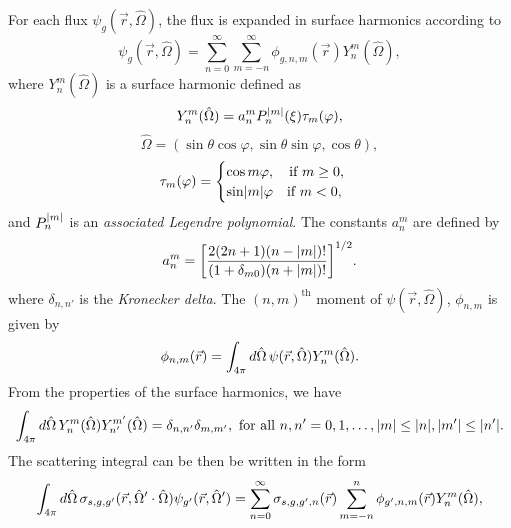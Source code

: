 For each flux $\psi_{g}(\vec{r},\hat{\Omega})$, the flux is expanded in surface harmonics according to
\begin{equation}
	\psi_{g}(\vec{r},\hat{\Omega}) = \sum_{n=0}^{\infty} \sum_{m=-n}^{\infty} \phi_{g,n,m}(\vec{r}) Y_{n}^{m}(\hat{\Omega}),
\end{equation}
where $Y_{n}^{m}(\hat{\Omega})$ is a surface harmonic defined as
\begin{equation}
	Y_{n}^{m}(\hat{\Omega}) = a_{n}^{m} P_{n}^{\lvert m\rvert}(\xi) \tau_{m}(\varphi),
\end{equation}
\begin{equation}
\hat{\Omega} = (\sin \theta \cos \varphi, \sin \theta \sin \varphi, \cos \theta),
\end{equation}
\begin{equation}
	\tau_{m}(\varphi) = \begin{cases}
					\cos m\varphi, \quad \text{if } m \geq 0, \\
					\sin \lvert m\rvert \varphi \quad \text{if } m < 0,
				      \end{cases}
\end{equation}
and $P_{n}^{\lvert m\rvert}$ is an \textit{associated Legendre polynomial}. The constants $a_{n}^{m}$ are defined by
\begin{equation}
	a_{n}^{m} = \bigg [ \frac{2(2n+1)(n-\lvert m\rvert)!}{(1+\delta_{m0})(n + \lvert m\rvert)!} \bigg ]^{1/2}.
\end{equation}
where $\delta_{n,n'}$ is the \textit{Kronecker delta}. The $(n,m)^{\text{th}}$ moment of $\psi(\vec{r}, \hat{\Omega})$, $\phi_{n,m}$ is given by
\begin{equation}
	\phi_{n,m}(\vec{r}) = \int_{4\pi} \mathop{}\!d \hat{\Omega} \, \psi(\vec{r},\hat{\Omega}) Y_{n}^{m}(\hat{\Omega}).
\end{equation}
From the properties of the surface harmonics, we have
\begin{equation}
	\int_{4\pi} \mathop{}\!d \hat{\Omega} \, Y_{n}^{m}(\hat{\Omega}) Y_{n'}^{m'}(\hat{\Omega}) = \delta_{n,n'} \delta_{m,m'}, \text{ for all } n, n' = 0, 1, \dots, \lvert m\rvert \leq \lvert n\rvert, \lvert m'\rvert \leq \lvert n'\rvert.
\end{equation}
The scattering integral can be then be written in the form
\begin{equation}
	\int_{4\pi} \mathop{}\!d \hat{\Omega} \, \sigma_{s,g,g'}(\vec{r},\hat{\Omega}' \cdot \hat{\Omega}) \psi_{g'}(\vec{r},\hat{\Omega}') = \sum_{n=0}^{\infty} \sigma_{s,g,g',n}(\vec{r}) \sum_{m=-n}^{n} \phi_{g',n,m}(\vec{r})Y_{n}^{m}(\hat{\Omega}),
	\label{eq:ScattInt}
\end{equation}
